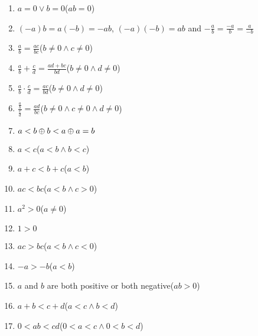 \documentclass[12pt, a4paper]{article}
\begin{document}
\begin{minipage}[t][0.55\textheight]{\textwidth}
\begin{minipage}{0.48\textwidth}
\begin{enumerate}[T\arabic*.]
        \item $a=0\lor b=0$\hfill($ab=0$)
        \item $(-a)b=a(-b)=-ab$, $(-a)(-b)=ab$ and $\displaystyle -\frac{a}{b}=\frac{-a}{b}=\frac{a}{-b}$ 
        \item $\displaystyle\frac{a}{b} = \frac{ac}{bc}$\hfill($b\neq0 \land c\neq0$) 
        \item $\displaystyle  \frac{a}{b}+\frac{c}{d}=\frac{ad+bc}{bd}$\hfill($b\neq 0 \land d\neq 0$) 
        \item $\displaystyle\frac{a}{b}\cdot \frac{c}{d}=\frac{ac}{bd}$\hfill($b\neq0 \land d\neq 0$)
        \item $\displaystyle \frac{\displaystyle \frac{a}{b}}{\displaystyle \frac{c}{d}} = \frac{ad}{bc}$\hfill($b\neq0 \land c\neq0 \land d\neq0$)
        \item $a<b \oplus b<a \oplus a=b$
        \item $a<c$\hfill($a<b \land b<c$)
        \item $a+c<b+c$\hfill($a<b$)
        \item $ac<bc$\hfill($a<b \land c>0$)
        \item $a^2>0$\hfill($a\neq 0$)
        \item $1>0$
        \item $ac>bc$\hfill($a<b \land c<0$)
        \item $-a>-b$\hfill($a<b$)
        \item $a$ and $b$ are both positive or both negative\hfill($ab>0$)
        \item $a+b<c+d$\hfill($a<c \land b<d$)
        \item $0<ab<cd$\hfill($0<a<c \land 0<b<d$)
      \end{enumerate}
    \end{minipage}
\end{minipage}

\end{document}

